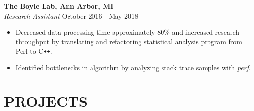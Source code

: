 \documentclass[overlapped]{res}
\begin{document}
\begin{resume}
\begin{itemize}





\end{itemize}

\textbf{The Boyle Lab, Ann Arbor, MI}\\
{\sl Research Assistant} \hfill October 2016 - May 2018
    \begin{itemize}  \itemsep -2pt %
    \item Decreased data processing time approximately 80\% 
    and increased research throughput
    by translating and refactoring statistical analysis program 
    from Perl to C\texttt{++}.
    
    \item Identified bottlenecks in algorithm by analyzing stack trace samples with \textit{perf}.
    
    

\end{itemize}

\section{PROJECTS}


\end{resume}
\end{document}
